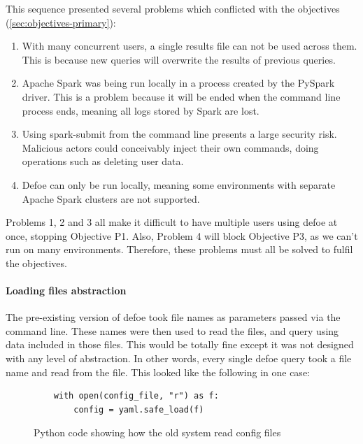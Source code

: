 \documentclass[12pt, letterpaper]{article}
\begin{document}
This sequence presented several problems which conflicted with the objectives (\ref{sec:objectives-primary}):
\begin{enumerate}
\item With many concurrent users, a single results file can not be used across them. This is because new queries will overwrite the results of previous queries.
\item Apache Spark was being run locally in a process created by the PySpark driver. This is a problem because it will be ended when the command line process ends, meaning all logs stored by Spark are lost.
\item Using spark-submit from the command line presents a large security risk. Malicious actors could conceivably inject their own commands, doing operations such as deleting user data.
\item Defoe can only be run locally, meaning some environments with separate Apache Spark clusters are not supported.
\end{enumerate}

\begin{flushleft}
Problems 1, 2 and 3 all make it difficult to have multiple users using defoe at once, stopping Objective P1. Also, Problem 4 will block Objective P3, as we can't run on many environments. Therefore, these problems must all be solved to fulfil the objectives.
\end{flushleft}

\paragraph{Loading files abstraction}

\begin{flushleft}
The pre-existing version of defoe took file names as parameters passed via the command line. These names were then used to read the files, and query using data included in those files. This would be totally fine except it was not designed with any level of abstraction. In other words, every single defoe query took a file name and read from the file. This looked like the following in one case:
\end{flushleft}

\begin{flushleft}
\begin{figure}[H]
\begin{verbatim}
    with open(config_file, "r") as f:
        config = yaml.safe_load(f)
\end{verbatim}
\caption{Python code showing how the old system read config files}
\end{figure}
\end{flushleft}
\end{document}

